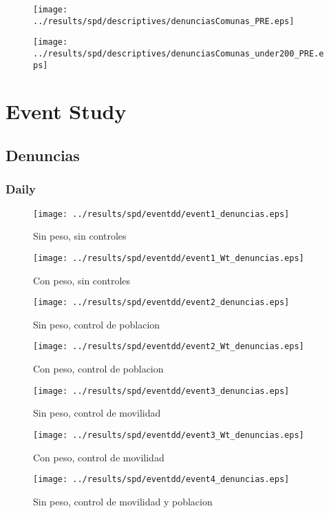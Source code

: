 \documentclass[11pt,letterpaper]{article}
\begin{document}
\begin{figure}[H]
\caption{}
\centering
\texttt{[image: ../results/spd/descriptives/denunciasComunas\_PRE.eps]}
\end{figure}

\begin{figure}[H]
\caption{}
\centering
\texttt{[image: ../results/spd/descriptives/denunciasComunas\_under200\_PRE.eps]}
\end{figure}

\section{Event Study}
	\subsection{Denuncias}
		\subsubsection{Daily}
\begin{figure}[H]
\caption{Sin peso, sin controles}
\centering
\texttt{[image: ../results/spd/eventdd/event1\_denuncias.eps]}
\end{figure}

\begin{figure}[H]
\caption{Con peso, sin controles}
\centering
\texttt{[image: ../results/spd/eventdd/event1\_Wt\_denuncias.eps]}
\end{figure}
\begin{figure}[H]
\caption{Sin peso, control de poblacion}
\centering
\texttt{[image: ../results/spd/eventdd/event2\_denuncias.eps]}
\end{figure}

\begin{figure}[H]
\caption{Con peso, control de poblacion}
\centering
\texttt{[image: ../results/spd/eventdd/event2\_Wt\_denuncias.eps]}
\end{figure}
\begin{figure}[H]
\caption{Sin peso, control de movilidad}
\centering
\texttt{[image: ../results/spd/eventdd/event3\_denuncias.eps]}
\end{figure}

\begin{figure}[H]
\caption{Con peso, control de movilidad}
\centering
\texttt{[image: ../results/spd/eventdd/event3\_Wt\_denuncias.eps]}
\end{figure}
\begin{figure}[H]
\caption{Sin peso, control de movilidad y poblacion}
\centering
\texttt{[image: ../results/spd/eventdd/event4\_denuncias.eps]}
\end{figure}
\end{document}
